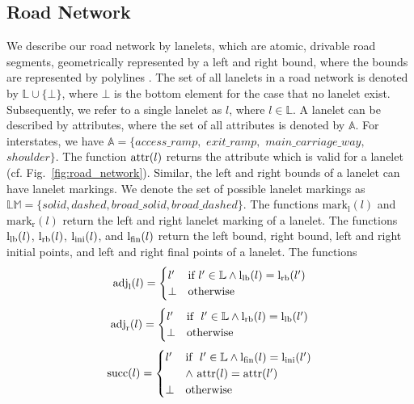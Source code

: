 \subsection{Road Network}
We describe our road network by lanelets, which are atomic, drivable road segments, geometrically represented by a left and right bound, where the bounds are represented by polylines \cite{Bender2014}. 
The set of all lanelets in a road network is denoted by $\mathbb{L} \cup \{\bot\}$, where $\bot$ is the bottom element for the case that no lanelet exist.
Subsequently, we refer to a single lanelet as $l$, where $l \in \mathbb{L}$. A lanelet can be described by attributes, where the set of all attributes is denoted by $\mathbb{A}$. For interstates, we have $\mathbb{A} =  \{access\_ramp,$ $exit\_ramp,$ $main\_carriage\_way,$ $shoulder \}$. The function $\operatorname*{attr}(l)$ returns the attribute which is valid for a lanelet (cf. Fig.~\ref{fig:road_network}). Similar, the left and right bounds of a lanelet can have lanelet markings. We denote the set of possible lanelet markings as $\mathbb{LM} = \{solid, dashed, broad\_solid, broad\_dashed \}$. The functions $\mathrm{mark}_\mathrm{l}(l)$ and $\mathrm{mark}_\mathrm{r}(l)$ return the left and right lanelet marking of a lanelet. 
The functions $\mathrm{l}_\mathrm{lb}(l)$, $\mathrm{l}_\mathrm{rb}(l)$, $\mathrm{l}_\mathrm{ini}(l)$, and $\mathrm{l}_\mathrm{fin}(l)$ return the left bound, right bound, left and right initial points, and left and right final points of a lanelet. The functions
\begin{equation}
\mathrm{adj}_\mathrm{l}(l) =
\begin{cases} 
l' & \text{if } l' \in \mathbb{L} \land \mathrm{l}_\mathrm{lb}(l) = \mathrm{l}_\mathrm{rb}(l')  \\ 
\bot & \text{otherwise} 
\end{cases}	
\end{equation}
\begin{equation}
\mathrm{adj}_\mathrm{r}(l) =
\begin{cases} 
l' & \text{if } \ l' \in \mathbb{L} \land \mathrm{l}_\mathrm{rb}(l) = \mathrm{l}_\mathrm{lb}(l')  \\
\bot & \text{otherwise} 
\end{cases}	
\end{equation}
\begin{equation}
\mathrm{succ}(l) =
\begin{cases} 
l' & \text{if } \ l' \in \mathbb{L} \land \mathrm{l}_\mathrm{fin}(l) = \mathrm{l}_\mathrm{ini}(l')  \\ 
& \land \, \operatorname*{attr}(l) = \operatorname*{attr}(l')   \\ 
\bot & \text{otherwise} 
\end{cases}	
\end{equation}
